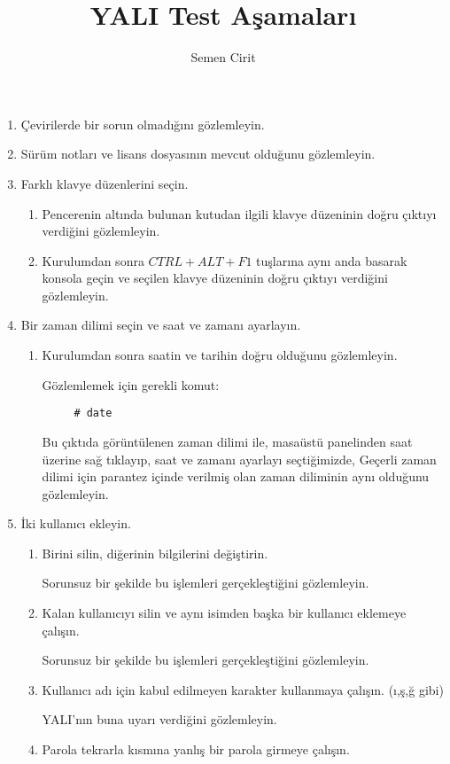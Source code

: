 \documentclass[a4paper,10pt]{article}
\title{YALI Test Aşamaları}
\author{Semen Cirit}
\begin{document}
\maketitle
\begin{enumerate}
\item Çevirilerde bir sorun olmadığını gözlemleyin.
\item Sürüm notları ve lisans dosyasının mevcut olduğunu gözlemleyin.
\item Farklı klavye düzenlerini seçin.
	\begin{enumerate}	
	\item Pencerenin altında bulunan kutudan ilgili klavye düzeninin doğru çıktıyı verdiğini gözlemleyin.
	\item Kurulumdan sonra $CTRL+ALT+F1$ tuşlarına aynı anda basarak konsola geçin ve seçilen klavye düzeninin doğru çıktıyı verdiğini gözlemleyin.
	\end{enumerate}
\item Bir zaman dilimi seçin ve saat ve zamanı ayarlayın.
    \begin{enumerate}
	\item Kurulumdan sonra saatin ve tarihin doğru olduğunu gözlemleyin.
	
	Gözlemlemek için gerekli komut:
	\begin{verbatim}
	 # date
	\end{verbatim}
	
	Bu çıktıda görüntülenen zaman dilimi ile, masaüstü panelinden saat üzerine sağ tıklayıp, saat ve zamanı ayarlayı seçtiğimizde, Geçerli zaman dilimi için parantez içinde verilmiş olan zaman diliminin aynı olduğunu gözlemleyin. 
        \end{enumerate}
\item İki kullanıcı ekleyin.
\begin{enumerate}
	\item Birini silin, diğerinin bilgilerini değiştirin.

	Sorunsuz bir şekilde bu işlemleri gerçekleştiğini gözlemleyin.
	\item Kalan kullanıcıyı silin ve aynı isimden başka bir kullanıcı eklemeye çalışın.

	Sorunsuz bir şekilde bu işlemleri gerçekleştiğini gözlemleyin.
	\item Kullanıcı adı için kabul edilmeyen karakter kullanmaya çalışın. (ı,ş,ğ gibi)
	
	YALI'nın buna uyarı verdiğini gözlemleyin.
	\item Parola tekrarla kısmına yanlış bir parola girmeye çalışın.


\end{enumerate}
\end{enumerate}
\end{document}
